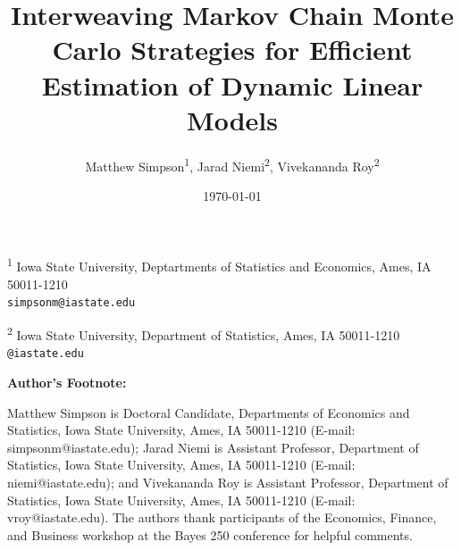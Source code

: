\documentclass[12pt]{article}
\begin{document}
\title{Interweaving Markov Chain Monte Carlo Strategies for Efficient
Estimation of Dynamic Linear Models}
\author{Matthew Simpson\textsuperscript{1}, Jarad Niemi\textsuperscript{2}, Vivekananda Roy\textsuperscript{2}}
\date{\today}
\maketitle

\begin{center}
 \vspace{-.5em}
 {\small \textsuperscript{1} Iowa State University, Deptartments of Statistics and Economics, Ames, IA 50011-1210\\[-.3em]
 {\tt simpsonm@iastate.edu}}
 
 \vspace{.5em}

{\small \textsuperscript{2} Iowa State University, Department of Statistics, Ames, IA 50011-1210\\[-.3em]
{\tt <niemi,vroy>@iastate.edu}}

\end{center}


\newpage

\mbox{}
\vspace*{2in}
\begin{center}
\textbf{Author's Footnote:}
\end{center}
Matthew Simpson is Doctoral Candidate, Departments of Economics and Statistics, Iowa State University, Ames, IA 50011-1210 (E-mail: simpsonm@iastate.edu); Jarad Niemi is Assistant Professor, Department of Statistics, Iowa State University, Ames, IA 50011-1210 (E-mail: niemi@iastate.edu); and Vivekananda Roy is Assistant Professor, Department of Statistics, Iowa State University, Ames, IA 50011-1210 (E-mail: vroy@iastate.edu). The authors thank participants of the Economics, Finance, and Business workshop at the Bayes 250 conference for helpful comments. %
\end{document}

